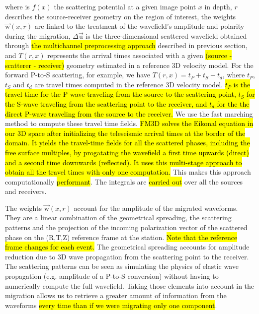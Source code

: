 \documentclass[10pt,a4paper]{article}
\begin{document}
\noindent where is $f(x)$ the scattering potential at a given image point $x$ in depth, 
$r$ describes the source-receiver geometry on the region of interest, 
the weights $\vec{\text{w}}(x,r)$ are linked to the treatment of the wavefield’s amplitude and polarity during the migration, 
$\Delta\vec{\text{u}}$ is the three-dimensional scattered wavefield obtained through \hl{the multichannel preprocessing approach} described in previous section, 
and $T(r,x)$ represents the arrival times associated with a given \hl{(source - scatterer - receiver)} geometry estimated in a reference 3D velocity model. 
For the forward P-to-S scattering, for example, we have $T(r,x) = t_P + t_S - t_d$, where $t_P$, $t_S$ and $t_d$ are travel times computed in the reference 3D velocity model.
\hl{$t_P$ is the travel time for the P-wave traveling from the source to the scattering point, $t_S$ for the S-wave traveling from the scattering point to the receiver, and $t_d$ for the the direct P-wave traveling from the source to the receiver.} 
We use the fast marching method \citep[FM3D,][]{deko_gji_06} to compute these travel time fields. 
\hl{FM3D solves the Eikonal equation in our 3D space after initializing the teleseismic arrival times at the border of the domain.
It yields the travel-time fields for all the scattered phases, including the free surface multiples, by progatating the wavefield a first time upwards (direct) and a second time downwards (reflected).
It uses this multi-stage approach to obtain all the travel times with only one computation.}
This makes this approach computationally \hl{performant}. 
The integrals are \hl{carried out} over all the sources and receivers.


The weights $\vec{\text{w}}(x,r)$ account for the amplitude of the migrated waveforms. 
They are a linear combination of the geometrical spreading, the scattering patterns and the projection of the incoming polarization vector of the scattered phase on the (R,T,Z) reference frame at the station.
\hl{Note that the reference frame changes for each event.}
The geometrical spreading accounts for amplitude reduction due to 3D wave propagation from the scattering point to the receiver.
The scattering patterns can be seen as simulating the physics of elastic wave propagation (e.g. amplitude of a P-to-S conversion) without having to numerically compute the full wavefield.
Taking those elements into account in the migration allows us to retrieve a greater amount of information from the waveforms \hl{every time than if we were migrating only one component}.
\end{document}
